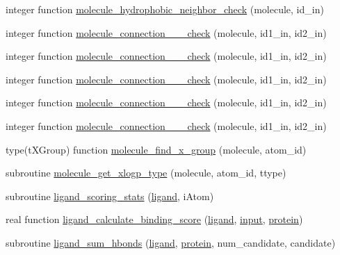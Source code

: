 \begin{DoxyCompactItemize}
\item 
integer function \hyperlink{classcalc__xscore_a6446e80b2b2c7ee7b6e718a7a112fe70}{molecule\-\_\-hydrophobic\-\_\-neighbor\-\_\-check} (molecule, id\-\_\-in)
\item 
integer function \hyperlink{classcalc__xscore_a4c7edb774bb0f3f995158261cf1f1c3f}{molecule\-\_\-connection\-\_\-\_\-\_\-check} (molecule, id1\-\_\-in, id2\-\_\-in)
\item 
integer function \hyperlink{classcalc__xscore_a9d9f27b4fed731d2a432dd7fb2e80b61}{molecule\-\_\-connection\-\_\-\_\-\_\-check} (molecule, id1\-\_\-in, id2\-\_\-in)
\item 
integer function \hyperlink{classcalc__xscore_a9d64d1541dd1138c926af1cd7156b621}{molecule\-\_\-connection\-\_\-\_\-\_\-check} (molecule, id1\-\_\-in, id2\-\_\-in)
\item 
integer function \hyperlink{classcalc__xscore_a5f6d4cba2fbc1d782a2c945931d18145}{molecule\-\_\-connection\-\_\-\_\-\_\-check} (molecule, id1\-\_\-in, id2\-\_\-in)
\item 
integer function \hyperlink{classcalc__xscore_a3d60864d00a78f29fd179bc1ec7d5656}{molecule\-\_\-connection\-\_\-\_\-\_\-check} (molecule, id1\-\_\-in, id2\-\_\-in)
\item 
type(t\-X\-Group) function \hyperlink{classcalc__xscore_a4ebde2035e6d41d711b8c1d681835d38}{molecule\-\_\-find\-\_\-x\-\_\-group} (molecule, atom\-\_\-id)
\item 
subroutine \hyperlink{classcalc__xscore_ac4c946777bf7b135cd6a533fa954e255}{molecule\-\_\-get\-\_\-xlogp\-\_\-type} (molecule, atom\-\_\-id, ttype)
\item 
subroutine \hyperlink{classcalc__xscore_a25da6b86c230610c51ec8e523934d799}{ligand\-\_\-scoring\-\_\-stats} (\hyperlink{classcalc__xscore_ad2efc1238a463be4b83681419cd6b113}{ligand}, i\-Atom)
\item 
real function \hyperlink{classcalc__xscore_aa21b212c6de7c3b229d8d91ee336630a}{ligand\-\_\-calculate\-\_\-binding\-\_\-score} (\hyperlink{classcalc__xscore_ad2efc1238a463be4b83681419cd6b113}{ligand}, \hyperlink{classcalc__xscore_a8bb1f4602ad30ce8f3059e0521c08824}{input}, \hyperlink{classcalc__xscore_a98803b585e24ba9794bf16dc263374dc}{protein})
\item 
subroutine \hyperlink{classcalc__xscore_aea7c036990db363fca0024d160a853bd}{ligand\-\_\-sum\-\_\-hbonds} (\hyperlink{classcalc__xscore_ad2efc1238a463be4b83681419cd6b113}{ligand}, \hyperlink{classcalc__xscore_a98803b585e24ba9794bf16dc263374dc}{protein}, num\-\_\-candidate, candidate)

\end{DoxyCompactItemize}

